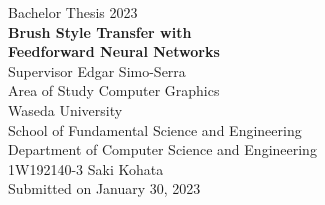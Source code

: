 \documentclass[a4paper, oneside, 12pt, dvipdfmx]{book}
\begin{document}


\begin{titlepage}
\begin{center}
    \vspace{0.1\textheight}
    {\Large Bachelor Thesis 2023} \\
    \vspace{0.1\textheight}
    \vspace{0.05\textheight}
    \textbf{\huge Brush Style Transfer with \\ Feedforward Neural Networks} \\
    \vfill
    {\hspace{0.025\textwidth}\Large Supervisor \hspace{0.02\textwidth} Edgar Simo-Serra} \\
    {\Large Area of Study \hspace{0.02\textwidth} Computer Graphics} \\
    \vspace{0.05\textheight}
    {\Large Waseda University\\}
    \vspace{0.02\textheight}
    {\Large
        School of Fundamental Science and Engineering \\
        Department of Computer Science and Engineering \\}
    \vspace{0.05\textheight}
    {\Large 1W192140-3 Saki Kohata \\}
    \vspace{0.05\textheight}
    {Submitted on January 30, 2023}
\end{center}
\end{titlepage}

\cleardoublepage
\end{document}
